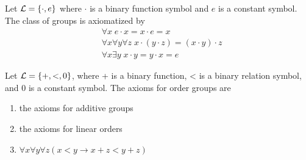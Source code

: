 \documentclass[11pt]{article}
\begin{document}
\begin{examplle}[Groups]
Let \(\mathcal{L}=\{\cdot,e\}\) where \(\cdot\) is a binary function symbol and \(e\) is a 
constant symbol. The class of groups is axiomatized by
\begin{align*}
&\forall x\;e\cdot x=x\cdot e=x\\
&\forall x\forall y\forall z\;x\cdot(y\cdot z)=(x\cdot y)\cdot z\\
&\forall x\exists y\;x\cdot y=y\cdot x= e
\end{align*}
\end{examplle}

\begin{examplle}
Let \(\mathcal{L}=\{+,<,0\}\), where + is a binary function, < is a binary relation
symbol, and 0 is a constant symbol. The axioms for order groups are
\begin{enumerate}
\item the axioms for additive groups
\item the axioms for linear orders
\item \(\forall x\forall y\forall z(x<y\to x+z<y+z)\)
\end{enumerate}
\end{examplle}
\end{document}
